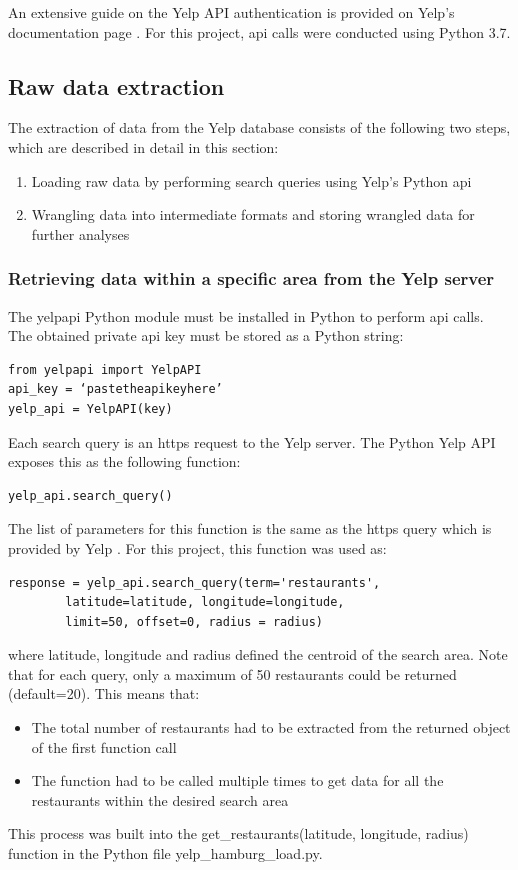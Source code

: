 \documentclass[a4paper, 11pt, oneside]{Thesis}  %
\begin{document}
An extensive guide on the Yelp API authentication is provided on Yelp’s documentation page \cite{Yelp.Fusion.Authentication}.
For this project, \ac{api} calls were conducted using Python 3.7.

\subsection{Raw data extraction}

The extraction of data from the Yelp database consists of the following two steps, which are described in detail in this section:
\begin{enumerate}
\item Loading raw data by performing search queries using Yelp’s Python \ac{api}
\item Wrangling data into intermediate formats and storing wrangled data for further analyses
\end{enumerate}

\subsubsection{Retrieving data within a specific area from the Yelp server}
\label{retrieving_data_within_a_certain_area}

The yelpapi Python module \cite{GeoffreyFairchild.11.07.2018} must be installed in Python to perform \ac{api} calls. The obtained private \ac{api} key must be stored as a Python string:

\begin{verbatim}
from yelpapi import YelpAPI
api_key = ‘pastetheapikeyhere’
yelp_api = YelpAPI(key)
\end{verbatim}

Each search query is an https request to the Yelp server. The Python Yelp API exposes this as the following function:
\begin{verbatim}
yelp_api.search_query()
\end{verbatim}

The list of parameters for this function is the same as the https query which is provided by Yelp \cite{yelp.businesses.search}. For this project, this function was used as:
\begin{verbatim}
response = yelp_api.search_query(term='restaurants',
	 	latitude=latitude, longitude=longitude, 
		limit=50, offset=0, radius = radius)
\end{verbatim}
where latitude, longitude and radius defined the centroid of the search area.
Note that for each query, only a maximum of 50 restaurants could be returned (default=20). This means that:
\begin{itemize}
\item The total number of restaurants had to be extracted from the returned object of the first function call
\item The function had to be called multiple times to get data for all the restaurants within the desired search area
\end{itemize}
This process was built into the get\_restaurants(latitude, longitude, radius) function in the Python file yelp\_hamburg\_load.py.
\end{document}
